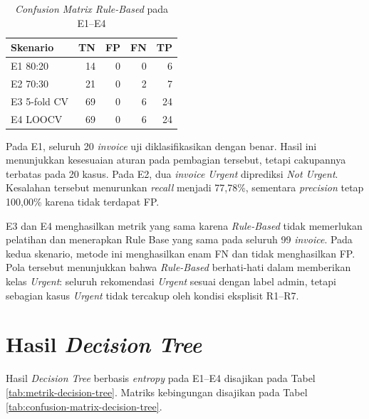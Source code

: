 \begin{table}[htbp]
    \centering
    \caption{\textit{Confusion Matrix Rule-Based} pada E1--E4}
    \label{tab:confusion-matrix-rule-based}
    \small
    \renewcommand{\arraystretch}{1.2}
    \begin{tabular}{lrrrr}
        \toprule
        \textbf{Skenario} & \textbf{TN} & \textbf{FP} & \textbf{FN} & \textbf{TP} \\
        \midrule
        E1 80:20 & 14 & 0 & 0 & 6 \\
        E2 70:30 & 21 & 0 & 2 & 7 \\
        E3 5-fold CV & 69 & 0 & 6 & 24 \\
        E4 LOOCV & 69 & 0 & 6 & 24 \\
        \bottomrule
    \end{tabular}
\end{table}

Pada E1, seluruh 20 \textit{invoice} uji diklasifikasikan dengan benar. Hasil ini menunjukkan kesesuaian aturan pada pembagian tersebut, tetapi cakupannya terbatas pada 20 kasus. Pada E2, dua \textit{invoice Urgent} diprediksi \textit{Not Urgent}. Kesalahan tersebut menurunkan \textit{recall} menjadi 77,78\%, sementara \textit{precision} tetap 100,00\% karena tidak terdapat FP.

E3 dan E4 menghasilkan metrik yang sama karena \textit{Rule-Based} tidak memerlukan pelatihan dan menerapkan Rule Base yang sama pada seluruh 99 \textit{invoice}. Pada kedua skenario, metode ini menghasilkan enam FN dan tidak menghasilkan FP. Pola tersebut menunjukkan bahwa \textit{Rule-Based} berhati-hati dalam memberikan kelas \textit{Urgent}: seluruh rekomendasi \textit{Urgent} sesuai dengan label admin, tetapi sebagian kasus \textit{Urgent} tidak tercakup oleh kondisi eksplisit R1--R7.

\FloatBarrier

\section{Hasil \textit{Decision Tree}}

Hasil \textit{Decision Tree} berbasis \textit{entropy} pada E1--E4 disajikan pada Tabel \ref{tab:metrik-decision-tree}. Matriks kebingungan disajikan pada Tabel \ref{tab:confusion-matrix-decision-tree}.

